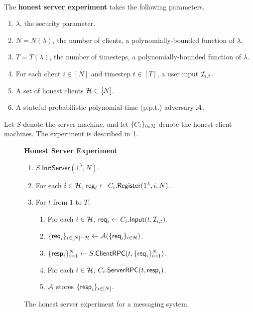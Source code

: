 \begin{definition}  \hfill\\
\label{defn:messaging-honest-server-experiment}
The \textbf{honest server experiment} takes the following parameters.

\begin{enumerate}
    \item $\lambda$, the security parameter.
    \item $N = N(\lambda)$, the number of clients, a polynomially-bounded function of $\lambda$.
    \item $T = T(\lambda)$, the number of timesteps, a polynomially-bounded function of $\lambda$.
    \item For each client $i \in [N]$ and timestep $t \in [T]$, a user input $\mathcal{I}_{i, t}$.
    \item A set of honest clients $\mathcal{H} \subset [N]$.
    \item A stateful probabilistic polynomial-time (p.p.t.) adversary $\mathcal{A}$.
\end{enumerate}

Let $S$ denote the server machine, and let $\{C_i\}_{i \in \mathcal{H}}$ denote the honest client machines. The experiment is described in \cref{expr:messaging-honest-server}.
\begin{figure}[!ht]
\begin{framed}
\textbf{Honest Server Experiment}
\begin{enumerate}
\item $S.\mathsf{InitServer}(1^{\lambda}, N)$. 
\item For each $i \in \mathcal{H}$, $\mathsf{reg}_i \leftarrow C_i.\mathsf{Register}(1^{\lambda}, i, N)$. 
\item For $t$ from $1$ to $T$:
    \begin{enumerate}
    \item For each $i \in \mathcal{H}$, $\mathsf{req}_i \leftarrow C_i.\mathsf{Input}(t, \mathcal{I}_{i,t})$.

    \item $\{\mathsf{req}_i\}_{i \in [N] - \mathcal{H}} \leftarrow \mathcal{A}(\{\mathsf{req}_i\}_{i \in \mathcal{H}})$.
    
    \item $\{\mathsf{resp}_i\}_{i = 1}^N \leftarrow S.\mathsf{ClientRPC}(t, \{\mathsf{req}_i\}_{i = 1}^N)$.
    
    \item For each $i \in \mathcal{H}$, $C_i.\mathsf{ServerRPC}(t, \mathsf{resp}_i)$.

    \item $\mathcal{A}$ stores $\{\mathsf{resp}_i\}_{i \in [N]}$.
    \end{enumerate}
\end{enumerate}
\end{framed}
\caption{The honest server experiment for a messaging system.}
\label{expr:messaging-honest-server}
\end{figure}

\end{definition}

